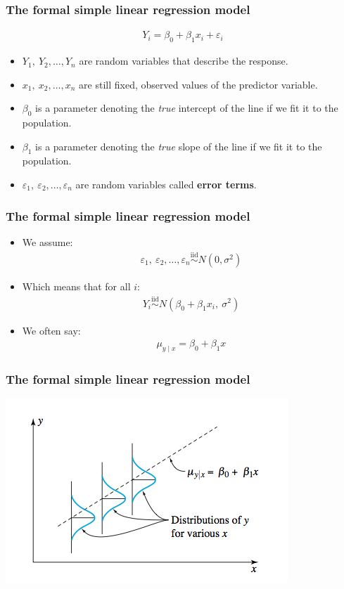 \documentclass[handout]{beamer}\usepackage[]{graphicx}\usepackage[]{color}
\providecommand{\e}{\varepsilon}
\numberwithin{equation}{section}
\begin{document}
\begin{frame}
\frametitle{The formal simple linear regression model} \small
\begin{align*}
Y_i = \beta_0 + \beta_1 x_i + \e_i
\end{align*}
\begin{itemize}
\pause \item $Y_1, \ Y_2, \ldots, Y_n$ are random variables that describe the response.
\pause \item $x_1, \ x_2, \ldots, x_n$ are still fixed, observed values of the predictor variable.
\pause \item $\beta_0$ is a parameter denoting the \emph{true} intercept of the line if we fit it to the population.
\pause \item $\beta_1$ is a parameter denoting the \emph{true} slope of the line if we fit it to the population.
\pause \item $\e_1, \ \e_2, \ldots, \e_n$ are random variables called {\bf error terms}.
\end{itemize}
\end{frame}

\begin{frame}
\frametitle{The formal simple linear regression model} \small

\begin{itemize}
\item We assume:
\begin{align*}
\e_1, \ \e_2, \ldots, \e_n \stackrel{\text{iid}}{\sim} N(0, \sigma^2)
\end{align*}
\pause \item Which means that for all $i$:
\begin{align*}
Y_i \stackrel{\text{iid}}{\sim} N(\beta_0 + \beta_1 x_i, \ \sigma^2)
\end{align*}
\pause \item We often say:
\begin{align*}
\mu_{y \mid x} = \beta_0 + \beta_1 x
\end{align*}
\end{itemize}
\end{frame}

\begin{frame}
\frametitle{The formal simple linear regression model}
 \includegraphics{../../fig/normalsimplereg.png}
\end{frame}
\end{document}
